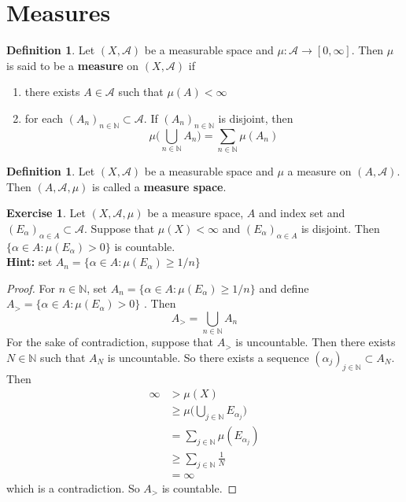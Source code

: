 \documentclass{book}
\theoremstyle{definition}
\newtheorem{defn}[definition]{Definition}
\newtheorem{ex}[definition]{Exercise}
\newcommand{\al}{\alpha}
\newcommand{\N}{\mathbb{N}}
\newcommand{\MA}{\mathcal{A}}
\newcommand{\lex}[1]{\label{ex:#1}}
\newcommand{\ld}[1]{\label{defn:#1}}
\DeclareMathOperator*{\0}{\mbf{0}}
\DeclareMathOperator*{\1}{\mbf{1}}
\newcommand{\RG}{[0,\infty]}
\begin{document}
	
	
	
	
	
	
	
	
	
	
	
	
	
	
	
	
	
	
	
	
	\newpage
	\section{Measures}
	
	\begin{defn} \ld{00000} 
		Let $(X, \MA)$ be a measurable space and $\mu:\MA \rightarrow \RG$. Then $\mu$ is said to be a \textbf{measure} on $(X, \MA)$ if 
		\begin{enumerate}
			\item there exists $A \in \MA$ such that $\mu(A)< \infty$
			\item for each $(A_n)_{n \in \N} \subset \MA$. If $(A_n)_{n \in \N}$ is disjoint, then $$\mu\bigg(\bigcup_{n \in \N}A_n \bigg) = \sum_{n \in \N}\mu(A_n)$$
		\end{enumerate}
	\end{defn}
	
	\begin{defn} \ld{00000} 
		Let $(X,\MA)$ be a measurable space and $\mu$ a measure on $(A, \MA)$. Then $(A, \MA, \mu)$ is called a \textbf{measure space}. 
	\end{defn}
	
	\begin{ex} \lex{00000} 
	Let $(X, \MA, \mu)$ be a measure space, $A$ and index set and $(E_{\al})_{\al \in A} \subset \MA$. Suppose that $\mu(X) < \infty$ and $(E_\al)_{\al \in A }$ is disjoint. Then $\{\al \in A: \mu(E_{\al}) >0\}$ is countable.\\
	\textbf{Hint:} set $A_n = \{\al \in A: \mu(E_{\al}) \geq 1/n \}$ 
	\end{ex}
	
	\begin{proof}
	For $n \in \N$, set $A_n = \{\al \in A: \mu(E_{\al}) \geq 1/n \}$ and define $ A_> = \{\al \in A: \mu(E_{\al}) >0\}$ . Then 
	$$A_> = \bigcup_{n \in \N}A_n$$
	For the sake of contradiction, suppose that 
	$A_>$ is uncountable. Then there exists $N \in \N$ such that $A_N$ is uncountable. So there exists a sequence $(\al_j)_{j \in \N} \subset A_N$. Then 
	\begin{align*}
	\infty 
	& > \mu(X) \\
	& \geq \mu \bigg( \bigcup_{j \in \N} E_{\al_{j}} \bigg) \\
	&= \sum_{j \in \N} \mu(E_{\al_j}) \\
	& \geq \sum_{j \in \N} \frac{1}{N} \\
	&= \infty
	\end{align*} 
	which is a contradiction. So $A_>$ is countable.
	\end{proof}
	
\end{document}
